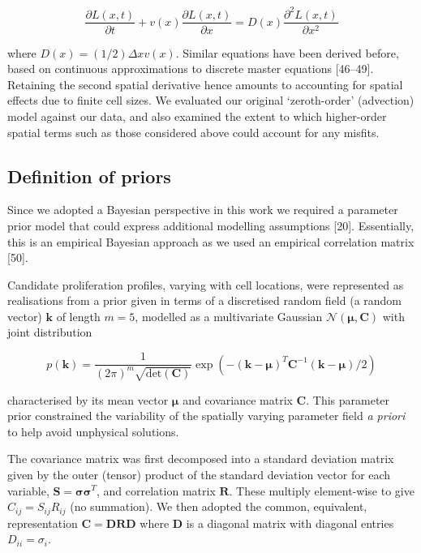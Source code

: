 \documentclass[10pt,letterpaper]{article}
\begin{document}
\begin{equation}\frac{\partial L(x,t)}{\partial t} + v(x)\frac{\partial L(x,t)}{\partial x} = D(x)\frac{\partial^2 L(x,t)}{\partial x^2}\label{eq:model-pde-higher-two}\end{equation}

where \(D(x) = (1/2)\Delta x v(x)\). Similar equations have been derived
before, based on continuous approximations to discrete master equations
{[}46--49{]}. Retaining the second spatial derivative hence amounts to
accounting for spatial effects due to finite cell sizes. We evaluated
our original `zeroth-order' (advection) model against our data, and also
examined the extent to which higher-order spatial terms such as those
considered above could account for any misfits.

\subsection{Definition of priors}\label{definition-of-priors}

Since we adopted a Bayesian perspective in this work we required a
parameter prior model that could express additional modelling
assumptions {[}20{]}. Essentially, this is an empirical Bayesian
approach as we used an empirical correlation matrix {[}50{]}.

Candidate proliferation profiles, varying with cell locations, were
represented as realisations from a prior given in terms of a discretised
random field (a random vector) \(\mathbf{k}\) of length \(m=5\),
modelled as a multivariate Gaussian
\(\mathcal{N}(\boldsymbol{\mu},\mathbf{C})\) with joint distribution

\begin{equation}p(\mathbf{k}) = \frac{1}{(2\pi)^m\sqrt{\mbox{det}(\mathbf{C})}}\exp(-(\mathbf{k}-\boldsymbol{\mu})^T\mathbf{C}^{-1}(\mathbf{k}-\boldsymbol{\mu})/2)\label{eq:prior}\end{equation}

characterised by its mean vector \(\boldsymbol{\mu}\) and covariance
matrix \(\mathbf{C}\). This parameter prior constrained the variability
of the spatially varying parameter field \emph{a priori} to help avoid
unphysical solutions.

The covariance matrix was first decomposed into a standard deviation
matrix given by the outer (tensor) product of the standard deviation
vector for each variable,
\(\mathbf{S} = \boldsymbol{\sigma}\boldsymbol{\sigma}^T\), and
correlation matrix \(\mathbf{R}\). These multiply element-wise to give
\(C_{ij} = S_{ij}R_{ij}\) (no summation). We then adopted the common,
equivalent, representation
\(\mathbf{C} = \mathbf{D}\mathbf{R}\mathbf{D}\) where \(\mathbf{D}\) is
a diagonal matrix with diagonal entries \(D_{ii} = \sigma_i\).
\end{document}

